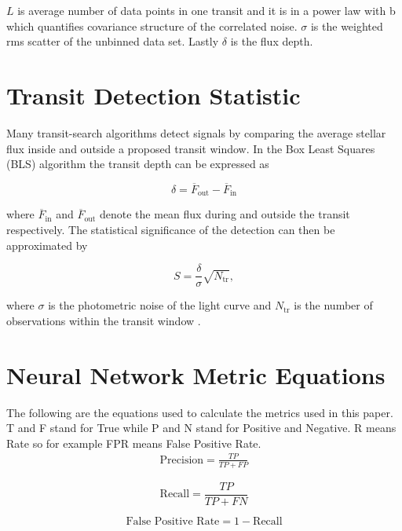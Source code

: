\documentclass[12pt]{article}%
\begin{document}
$L$ is average number of data points in one transit and it is in a power law with b which quantifies covariance structure of the correlated noise. $\sigma$ is the weighted rms scatter of the unbinned data set. Lastly $\delta$ is the flux depth. \citep{2006MNRAS.373..799C} 

\section{Transit Detection Statistic} \label{sec:Transit_Detection_Statistic}

Many transit-search algorithms detect signals by comparing the average
stellar flux inside and outside a proposed transit window. In the
Box Least Squares (BLS) algorithm the transit depth can be expressed as

\begin{equation}
\delta = \overline{F}_{\mathrm{out}} - \overline{F}_{\mathrm{in}}
\end{equation}

where $\overline{F}_{\mathrm{in}}$ and $\overline{F}_{\mathrm{out}}$ denote
the mean flux during and outside the transit respectively. The statistical
significance of the detection can then be approximated by

\begin{equation}
S = \frac{\delta}{\sigma}\sqrt{N_{\mathrm{tr}}},
\end{equation}

where $\sigma$ is the photometric noise of the light curve and
$N_{\mathrm{tr}}$ is the number of observations within the transit window \citep{BLS_Algorithm}.

\section{Neural Network Metric Equations} \label{sec:NN_equations}

The following are the equations used to calculate the metrics used in this paper. T and F stand for True while P and N stand for Positive and Negative. R means Rate so for example FPR means False Positive Rate.
\begin{align}
    \text{Precision} = \frac{TP}{TP+FP}
\end{align}

\begin{equation}
    \text{Recall} = \frac{TP}{TP+FN}
\end{equation}

\begin{equation}
    \text{False Positive Rate} = 1 - \text{Recall}
\end{equation}
\end{document}

